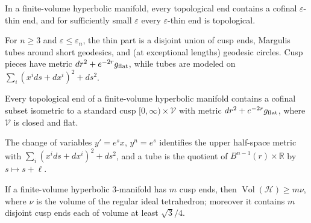 \begin{lemma}
\label{lem:chow-iv-topological-ends-thin}
In a finite-volume hyperbolic manifold, every topological end contains a
cofinal \(\varepsilon\)-thin end, and for sufficiently small \(\varepsilon\)
every \(\varepsilon\)-thin end is topological.
\end{lemma}

\begin{theorem}
\label{thm:chow-iv-thin-part-structure}
For \(n\ge3\) and \(\varepsilon\le\varepsilon_n\), the thin part is a disjoint
union of cusp ends, Margulis tubes around short geodesics, and (at exceptional
lengths) geodesic circles.  Cusp pieces have metric
\(dr^2+e^{-2r}g_{\rm flat}\), while tubes are modeled on
\(\sum_i(x^i ds+dx^i)^2+ds^2\).
\end{theorem}

\begin{theorem}
\label{thm:chow-iv-finite-volume-ends-cusps}
Every topological end of a finite-volume hyperbolic manifold contains a
cofinal subset isometric to a standard cusp
\([0,\infty)\times\mathcal V\) with metric
\(dr^2+e^{-2r}g_{\rm flat}\), where \(\mathcal V\) is closed and flat.
\end{theorem}

\begin{example}
\label{ex:chow-iv-margulis-tube-quotient}
The change of variables \(y'=e^s x\), \(y^n=e^s\) identifies the upper
half-space metric with \(\sum_i(x^i ds+dx^i)^2+ds^2\), and a tube is the quotient
of \(B^{n-1}(r)\times\mathbb R\) by \(s\mapsto s+\ell\).
\end{example}

\begin{theorem}
\label{thm:chow-iv-cusp-volume-bound}
If a finite-volume hyperbolic 3-manifold has \(m\) cusp ends, then
\(\operatorname{Vol}(\mathcal H)\ge m\nu\), where \(\nu\) is the volume of the
regular ideal tetrahedron; moreover it contains \(m\) disjoint cusp ends each
of volume at least \(\sqrt3/4\).
\end{theorem}

